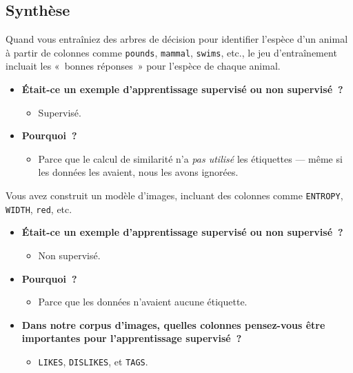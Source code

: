 \documentclass[12pt,a4paper]{article}
\begin{document}
\subsection{Synthèse}

\begin{thinkbox}
  Quand vous entraîniez des arbres de décision pour identifier l'espèce d'un animal à partir de colonnes comme \texttt{pounds}, \texttt{mammal}, \texttt{swims}, etc., le jeu d'entraînement incluait les «~bonnes réponses~» pour l'espèce de chaque animal.

  \begin{itemize}
    \item \textbf{Était-ce un exemple d'apprentissage supervisé ou non supervisé~?}
    \begin{itemize}
      \item Supervisé.
    \end{itemize}
    \item \textbf{Pourquoi~?}
    \begin{itemize}
      \item Parce que le calcul de similarité n'a \emph{pas utilisé} les étiquettes — même si les données les avaient, nous les avons ignorées.
    \end{itemize}
  \end{itemize}

  Vous avez construit un modèle d'images, incluant des colonnes comme \texttt{ENTROPY}, \texttt{WIDTH}, \texttt{red}, etc.

  \begin{itemize}
    \item \textbf{Était-ce un exemple d'apprentissage supervisé ou non supervisé~?}
    \begin{itemize}
      \item Non supervisé.
    \end{itemize}
    \item \textbf{Pourquoi~?}
    \begin{itemize}
      \item Parce que les données n'avaient aucune étiquette.
    \end{itemize}
    \item \textbf{Dans notre corpus d'images, quelles colonnes pensez-vous être importantes pour l'apprentissage supervisé~?}
    \begin{itemize}
      \item \texttt{LIKES}, \texttt{DISLIKES}, et \texttt{TAGS}.
    \end{itemize}
  \end{itemize}
\end{thinkbox}
\end{document}
